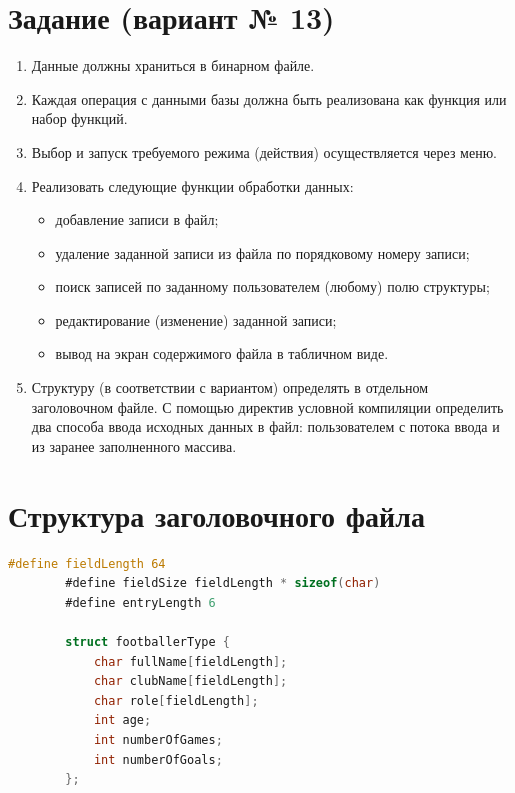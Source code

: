 \documentclass[12pt]{article}
\begin{document}
	\newpage
	
	
	\section{Задание (вариант № 13)}
	
	\begin{enumerate}
		\item Данные должны храниться в бинарном файле.
		\item Каждая операция с данными базы должна быть реализована как функция или набор функций.
		\item Выбор и запуск требуемого режима (действия) осуществляется через меню.
		\item Реализовать следующие функции обработки данных:
		\begin{itemize}
			\item добавление записи в файл;
			\item удаление заданной записи из файла по порядковому номеру записи;
			\item поиск записей по заданному пользователем (любому) полю структуры;
			\item редактирование (изменение) заданной записи;
			\item вывод на экран содержимого файла в табличном виде.
		\end{itemize}
		\item Структуру (в соответствии с вариантом) определять в отдельном заголовочном файле. С
		помощью директив условной компиляции определить два способа ввода исходных данных в
		файл: пользователем с потока ввода и из заранее заполненного массива.
	\end{enumerate}
	
	\newpage
	
	\section{Структура заголовочного файла}
	
	\begin{lstlisting}[language=C]
		#define fieldLength 64
		#define fieldSize fieldLength * sizeof(char)
		#define entryLength 6
		
		struct footballerType {
			char fullName[fieldLength];
			char clubName[fieldLength];
			char role[fieldLength];
			int age;
			int numberOfGames;
			int numberOfGoals;
		};
	\end{lstlisting}
	
\end{document}
